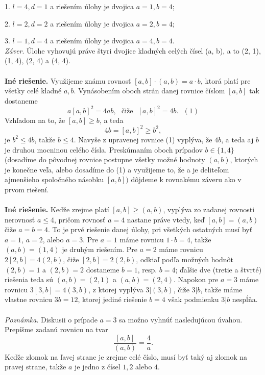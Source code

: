 \documentclass[11pt,a4paper,oneside,final]{book}
\begin{document}
1. $l = 4, d = 1$ a riešením úlohy je dvojica $a = 1, b = 4$;

2. $l = 2, d = 2$ a riešením úlohy je dvojica $a = 2, b = 4$;

3. $l = 1, d = 4$ a riešením úlohy je dvojica $a = 4, b = 4$.\\

\textit{Záver}. Úlohe vyhovujú práve štyri dvojice kladných celých čísel (a, b), a to (2, 1), (1, 4),
(2, 4) a (4, 4).\\
\\
\textbf{Iné riešenie.} Využijeme známu rovnosť $[a, b] \cdot (a, b) = a \cdot b$, ktorá platí pre všetky celé kladné $a, b$. Vynásobením oboch strán danej rovnice číslom $[a, b]$ tak dostaneme
$$a[a, b]^2= 4ab, \ \ \ \text{čiže} \ \ \  [a, b]^2= 4b.\ \ \  (1)$$
Vzhľadom na to, že $[a, b] \geq b$, a teda
$$4b = [a, b]^2\geq b^2,$$
je $b^2\leq 4b$, takže $b \leq 4$. Navyše z upravenej rovnice (1) vyplýva, že $4b$, a teda aj $b$ je druhou mocninou celého čísla. Preskúmaním oboch prípadov $b \in \{1, 4\}$ (dosadíme do pôvodnej rovnice postupne všetky možné hodnoty $(a, b)$, ktorých je konečne veľa, alebo dosadíme do (1) a využijeme to, že a je deliteľom  ajmenšieho spoločného násobku $[a, b])$ dôjdeme k rovnakému záveru ako v prvom riešení.\\
\\
\textbf{Iné riešenie.} Keďže zrejme platí $[a, b] \geq (a, b)$, vyplýva zo zadanej rovnosti nerovnosť $a \leq 4$, pričom rovnosť $a = 4$ nastane práve vtedy, keď $[a, b] = (a, b)$ čiže $a = b = 4$. To je prvé riešenie danej úlohy, pri všetkých ostatných musí byť $a = 1$, $a = 2$, alebo $a = 3$. Pre $a = 1$ máme rovnicu $1 \cdot b = 4$, takže $(a, b) = (1, 4)$ je druhým riešením. Pre $a = 2$ máme rovnicu $2[2, b] = 4(2, b)$, čiže $[2, b] = 2(2, b)$, odkiaľ podľa možných hodnôt $(2, b) = 1$ a $(2, b) = 2$ dostaneme $b =1$, resp. $b = 4$; ďalšie dve (tretie a štvrté) riešenia teda sú $(a, b) = (2, 1)$ a $(a, b) = (2, 4)$. Napokon pre $a = 3$ máme rovnicu $3[3, b] = 4(3, b)$, z ktorej vyplýva $3 | (3, b)$, čiže $3 | b$, takže máme vlastne rovnicu $3b = 12$, ktorej jediné riešenie $b = 4$ však podmienku $3 | b$ nespĺňa.\\
\\
\textit{Poznámka}. Diskusii o prípade $a = 3$ sa možno vyhnúť nasledujúcou úvahou. Prepíšme zadanú rovnicu na tvar $$\frac{[a, b]}{(a, b)}=\frac{4}{a}.$$
Keďže zlomok na ľavej strane je zrejme celé číslo, musí byť taký aj zlomok na pravej strane, takže $a$ je jedno z čísel $1, 2$ alebo $4$.\\
\end{document}
